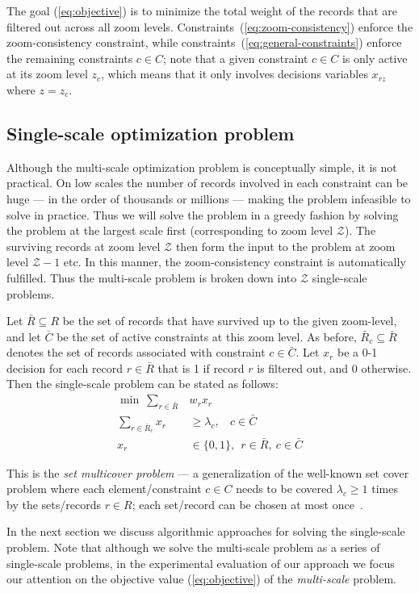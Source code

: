The goal (\ref{eq:objective}) is to minimize the total weight of the records that are filtered out across all zoom levels. Constraints~(\ref{eq:zoom-consistency}) enforce the zoom-consistency constraint, while constraints~(\ref{eq:general-constraints}) enforce the remaining constraints $c \in C$; note that a given constraint $c \in C$ is only active at its zoom level $z_c$, which means that it only involves decisions variables $x_{rz}$ where $z = z_c$.

\subsection{Single-scale optimization problem}

Although the multi-scale optimization problem is conceptually simple, it is not practical. On low scales the number of records involved in each constraint can be huge --- in the order of thousands or millions --- making the problem infeasible to solve in practice. Thus we will solve the problem in a greedy fashion by solving the problem at the largest scale first (corresponding to zoom level $\mathcal{Z}$). The surviving records at zoom level $\mathcal{Z}$ then form the input to the problem at zoom level $\mathcal{Z}-1$ etc. In this manner, the zoom-consistency constraint is automatically fulfilled. Thus the multi-scale problem is broken down into $\mathcal{Z}$ single-scale problems.

Let $\bar{R} \subseteq R$ be the set of records that have survived up to the given zoom-level, and let $\bar{C}$ be the set of active constraints at this zoom level. As before, $\bar{R}_c \subseteq \bar{R}$ denotes the set of records associated with constraint $c \in \bar{C}$. Let $x_r$ be a 0-1 decision for each record $r \in \bar{R}$ that is 1 if record $r$ is filtered out, and 0 otherwise. Then the single-scale problem can be stated as follows:
\begin{align}
  \label{eq:objective-single}
  \min ~\sum_{r \in \bar{R}} &w_r x_r \\
  \label{eq:general-constraints-single}
  \sum_{r \in \bar{R}_c} x_r &\geq \lambda_c, ~~~~ c \in \bar{C} \\
  x_r & \in \{0, 1\}, ~~ r \in \bar{R}, ~c \in \bar{C}
\end{align}

This is the \emph{set multicover problem} --- a generalization of the well-known set cover problem where each element/constraint $c \in C$ needs to be covered $\lambda_c \geq 1$ times by the sets/records $r \in R$; each set/record can be chosen at most once~\cite{RajogopalanVazirani98}. 

In the next section we discuss algorithmic approaches for solving the single-scale problem. Note that although we solve the multi-scale problem as a series of single-scale problems, in the experimental evaluation of our approach we focus our attention on the objective value (\ref{eq:objective}) of the \emph{multi-scale} problem. 

